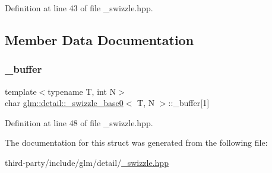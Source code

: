 Definition at line 43 of file \+\_\+swizzle.\+hpp.



\subsection{Member Data Documentation}
\mbox{\label{structglm_1_1detail_1_1__swizzle__base0_afd4b7f15c9acff4cdef808f559ffec2d}} 
\subsubsection{\texorpdfstring{\+\_\+buffer}{\_buffer}}
{\footnotesize\ttfamily template$<$typename T, int N$>$ \\
char \hyperlink{structglm_1_1detail_1_1__swizzle__base0}{glm\+::detail\+::\+\_\+swizzle\+\_\+base0}$<$ T, N $>$\+::\+\_\+buffer\mbox{[}1\mbox{]}\hspace{0.3cm}{\ttfamily [protected]}}



Definition at line 48 of file \+\_\+swizzle.\+hpp.



The documentation for this struct was generated from the following file\+:\begin{DoxyCompactItemize}
\item 
third-\/party/include/glm/detail/\hyperlink{__swizzle_8hpp}{\+\_\+swizzle.\+hpp}\end{DoxyCompactItemize}
